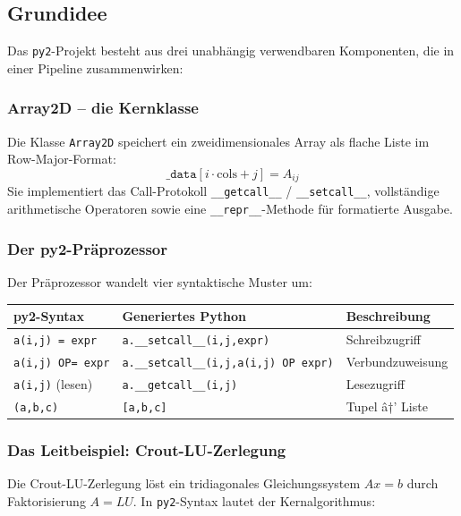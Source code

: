 ﻿\documentclass[a4paper,12pt]{article}
\theoremstyle{definition}
\begin{document}
\subsection{Grundidee}

Das \texttt{py2}-Projekt besteht aus drei unabh\"angig verwendbaren Komponenten,
die in einer Pipeline zusammenwirken:

\subsubsection{Array2D -- die Kernklasse}

Die Klasse \texttt{Array2D} speichert ein zweidimensionales Array als flache Liste
im Row-Major-Format:
\[
	\texttt{\_data}[i \cdot \text{cols} + j] = A_{ij}
\]
Sie implementiert das Call-Protokoll \texttt{\_\_getcall\_\_} / \texttt{\_\_setcall\_\_},
vollst\"andige arithmetische Operatoren sowie eine \texttt{\_\_repr\_\_}-Methode
f\"ur formatierte Ausgabe.

\subsubsection{Der py2-Pr\"aprozessor}

Der Pr\"aprozessor wandelt vier syntaktische Muster um:

\begin{center}
\begin{tabular}{lll}
\toprule
\textbf{py2-Syntax} & \textbf{Generiertes Python} & \textbf{Beschreibung} \\
\midrule
\texttt{a(i,j) = expr} & \texttt{a.\_\_setcall\_\_(i,j,expr)} & Schreibzugriff \\
\texttt{a(i,j) OP= expr} & \texttt{a.\_\_setcall\_\_(i,j,a(i,j) OP expr)} & Verbundzuweisung \\
\texttt{a(i,j)} (lesen) & \texttt{a.\_\_getcall\_\_(i,j)} & Lesezugriff \\
\texttt{(a,b,c)} & \texttt{[a,b,c]} & Tupel â†’ Liste \\
\bottomrule
\end{tabular}
\end{center}

\subsubsection{Das Leitbeispiel: Crout-LU-Zerlegung}

Die Crout-LU-Zerlegung l\"ost ein tridiagonales Gleichungssystem $Ax = b$ durch
Faktorisierung $A = LU$. In \texttt{py2}-Syntax lautet der Kernalgorithmus:
\end{document}
